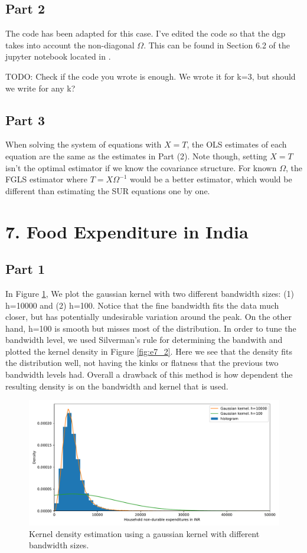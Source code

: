 \documentclass[10pt]{report}
\begin{document}
\subsection*{Part 2}
The code has been adapted for this case. I've edited the code so that the dgp takes into account the non-diagonal $\Omega$. This can be found in Section 6.2 of the jupyter notebook located in .

TODO: Check if the code you wrote is enough. We wrote it for k=3, but should we write for any k?

\subsection*{Part 3}
When solving the system of equations with $X=T$, the OLS estimates of each equation are the same as the estimates in Part (2). Note though, setting $X=T$ isn't the optimal estimator if we know the covariance structure. For known $\Omega$, the FGLS estimator where $T = X \Omega^{-1}$ would be a better estimator, which would be different than estimating the SUR equations one by one.

\section*{7. Food Expenditure in India}
\subsection*{Part 1}
In Figure \ref{fig:e7_1}, We plot the gaussian kernel with two different bandwidth sizes: (1) h=10000 and (2) h=100. Notice that the fine bandwidth fits the data much closer, but has potentially undesirable variation around the peak. On the other hand, h=100 is smooth but misses most of the distribution. In order to tune the bandwidth level, we used Silverman's rule for determining the bandwith and plotted the kernel density in Figure \ref{fig:e7_2}. Here we see that the density fits the distribution well, not having the kinks or flatness that the previous two bandwidth levels had. Overall a drawback of this method is how dependent the resulting density is on the bandwidth and kernel that is used.
\begin{figure}[!h]
    \centering 
    \includegraphics[width=.8\textwidth]{../Output/fig_kernel_trials_gauss_kde.pdf}\caption{Kernel density estimation using a gaussian kernel with different bandwidth sizes.}\label{fig:e7_1}
\end{figure}
\end{document}
